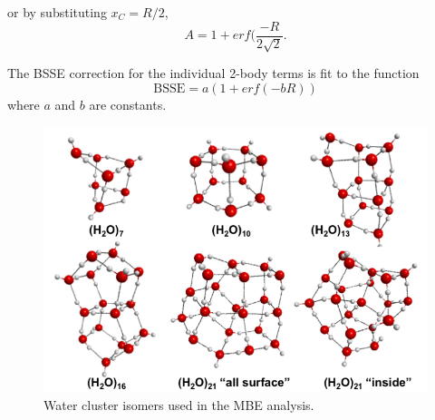 \documentclass[11pt, proquest]{uwthesis}[2020/02/24]
\begin{document}
or by substituting $x_C=R/2$,
\begin{equation}\label{eq:MBE_I_1}
    A=1+erf(\frac{-R}{2\sqrt{2}}.
\end{equation}

The BSSE correction for the individual 2-body terms is fit to the function
\begin{equation}\label{eq:MBE_I_2}
    \mathrm{BSSE}=a(1+erf(-bR))
\end{equation}
where $a$ and $b$ are constants.

\begin{figure}[t]
\uwsinglespace
\begin{center}
\includegraphics[width=\textwidth]{Figures/Chapter_2/cluster_structures.png}
\end{center}
\label{fig:MBE_I_F1}
\caption[Generating a facing caption page]{Water cluster isomers used in the MBE analysis.}
\end{figure}
\end{document}
